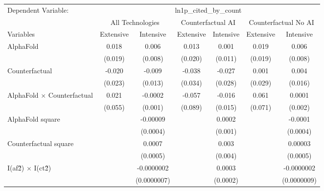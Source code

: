 \begingroup
\centering
\begin{tabular}{lcccccc}
   \tabularnewline \midrule \midrule
   Dependent Variable: & \multicolumn{6}{c}{ln1p\_cited\_by\_count}\\
 & \multicolumn{2}{c}{All Technologies} & \multicolumn{2}{c}{Counterfactual AI} & \multicolumn{2}{c}{Counterfactual No AI} \\
\cmidrule(lr){1-1}\cmidrule(lr){2-3} \cmidrule(lr){4-5} \cmidrule(lr){6-7}
Variables & \multicolumn{1}{c}{Extensive} & \multicolumn{1}{c}{Intensive} & \multicolumn{1}{c}{Extensive} & \multicolumn{1}{c}{Intensive} & \multicolumn{1}{c}{Extensive} & \multicolumn{1}{c}{Intensive} \\
\cmidrule(lr){1-1}\cmidrule(lr){2-2} \cmidrule(lr){3-3} \cmidrule(lr){4-4} \cmidrule(lr){5-5} \cmidrule(lr){6-6} \cmidrule(lr){7-7}
   AlphaFold                          & 0.018   & 0.006       & 0.013   & 0.001    & 0.019   & 0.006\\   
                                      & (0.019) & (0.008)     & (0.020) & (0.011)  & (0.019) & (0.008)\\   
   Counterfactual                     & -0.020  & -0.009      & -0.038  & -0.027   & 0.001   & 0.004\\   
                                      & (0.023) & (0.013)     & (0.034) & (0.028)  & (0.029) & (0.016)\\   
   AlphaFold $\times$ Counterfactual  & 0.021   & -0.0002     & -0.057  & -0.016   & 0.061   & 0.0001\\   
                                      & (0.055) & (0.001)     & (0.089) & (0.015)  & (0.071) & (0.002)\\   
   AlphaFold square                   &         & -0.00009    &         & 0.0002   &         & -0.0001\\   
                                      &         & (0.0004)    &         & (0.001)  &         & (0.0004)\\   
   Counterfactual square              &         & 0.0007      &         & 0.003    &         & 0.00003\\   
                                      &         & (0.0005)    &         & (0.004)  &         & (0.0005)\\   
   I(af\^2) $\times$ I(ct\^2)         &         & -0.0000002  &         & 0.0003   &         & -0.0000002\\   
                                      &         & (0.0000007) &         & (0.0002) &         & (0.0000009)\\   

\end{tabular}
